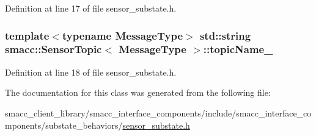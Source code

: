 Definition at line 17 of file sensor\+\_\+substate.\+h.

\subsubsection[{\texorpdfstring{topic\+Name\+\_\+}{topicName_}}]{\setlength{\rightskip}{0pt plus 5cm}template$<$typename Message\+Type$>$ std\+::string {\bf smacc\+::\+Sensor\+Topic}$<$ Message\+Type $>$\+::topic\+Name\+\_\+}\hypertarget{classsmacc_1_1SensorTopic_a555d2331f17700b087b3bf518a5367e1}{}\label{classsmacc_1_1SensorTopic_a555d2331f17700b087b3bf518a5367e1}


Definition at line 18 of file sensor\+\_\+substate.\+h.



The documentation for this class was generated from the following file\+:\begin{DoxyCompactItemize}
\item 
smacc\+\_\+client\+\_\+library/smacc\+\_\+interface\+\_\+components/include/smacc\+\_\+interface\+\_\+components/substate\+\_\+behaviors/\hyperlink{sensor__substate_8h}{sensor\+\_\+substate.\+h}\end{DoxyCompactItemize}
